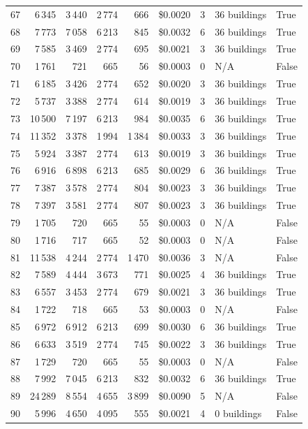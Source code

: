 \documentclass[a4paper,11pt]{article}
\begin{document}
\begin{table}[ht]
\begin{tabular}{r r r r r r r p{3cm} l}
67 & 6\,345 & 3\,440 & 2\,774 & 666 & \$0.0020 & 3 & 36 buildings & True \\
68 & 7\,773 & 7\,058 & 6\,213 & 845 & \$0.0032 & 6 & 36 buildings & True \\
69 & 7\,585 & 3\,469 & 2\,774 & 695 & \$0.0021 & 3 & 36 buildings & True \\
70 & 1\,761 & 721 & 665 & 56 & \$0.0003 & 0 & N/A & False \\
71 & 6\,185 & 3\,426 & 2\,774 & 652 & \$0.0020 & 3 & 36 buildings & True \\
72 & 5\,737 & 3\,388 & 2\,774 & 614 & \$0.0019 & 3 & 36 buildings & True \\
73 & 10\,500 & 7\,197 & 6\,213 & 984 & \$0.0035 & 6 & 36 buildings & True \\
74 & 11\,352 & 3\,378 & 1\,994 & 1\,384 & \$0.0033 & 3 & 36 buildings & True \\
75 & 5\,924 & 3\,387 & 2\,774 & 613 & \$0.0019 & 3 & 36 buildings & True \\
76 & 6\,916 & 6\,898 & 6\,213 & 685 & \$0.0029 & 6 & 36 buildings & True \\
77 & 7\,387 & 3\,578 & 2\,774 & 804 & \$0.0023 & 3 & 36 buildings & True \\
78 & 7\,397 & 3\,581 & 2\,774 & 807 & \$0.0023 & 3 & 36 buildings & True \\
79 & 1\,705 & 720 & 665 & 55 & \$0.0003 & 0 & N/A & False \\
80 & 1\,716 & 717 & 665 & 52 & \$0.0003 & 0 & N/A & False \\
81 & 11\,538 & 4\,244 & 2\,774 & 1\,470 & \$0.0036 & 3 & N/A & False \\
82 & 7\,589 & 4\,444 & 3\,673 & 771 & \$0.0025 & 4 & 36 buildings & True \\
83 & 6\,557 & 3\,453 & 2\,774 & 679 & \$0.0021 & 3 & 36 buildings & True \\
84 & 1\,722 & 718 & 665 & 53 & \$0.0003 & 0 & N/A & False \\
85 & 6\,972 & 6\,912 & 6\,213 & 699 & \$0.0030 & 6 & 36 buildings & True \\
86 & 6\,633 & 3\,519 & 2\,774 & 745 & \$0.0022 & 3 & 36 buildings & True \\
87 & 1\,729 & 720 & 665 & 55 & \$0.0003 & 0 & N/A & False \\
88 & 7\,992 & 7\,045 & 6\,213 & 832 & \$0.0032 & 6 & 36 buildings & True \\
89 & 24\,289 & 8\,554 & 4\,655 & 3\,899 & \$0.0090 & 5 & N/A & False \\
90 & 5\,996 & 4\,650 & 4\,095 & 555 & \$0.0021 & 4 & 0 buildings & False \\

\end{tabular}
\end{table}
\end{document}

